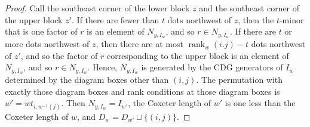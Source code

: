 \documentclass[ALCO,Unicode,published]{cedram}
\DeclareMathOperator{\rank}{rank}
\begin{document}
\begin{proof}
Call the southeast corner of the lower block $z$ and the southeast corner of the upper block $z'$.  If there are fewer than $t$ dots northwest of $z$, then the $t$-minor that is one factor of $r$ is an element of $N_{y,I_w}$, and so $r \in  N_{y,I_w}$.  If there are $t$ or more dots northwest of $z$, then there are at most $\rank_w(i.j)-t$ dots northwest of $z'$, and so the factor of $r$ corresponding to the upper block is an element of $N_{y,I_w}$, and so $r \in N_{y,I_w}$.  Hence, $N_{y,I_w}$ is generated by the CDG generators of $I_w$ determined by the diagram boxes other than $(i,j)$.  The permutation with exactly those diagram boxes and rank conditions at those diagram boxes is $w' = wt_{i,w^{-1}(j)}$.  Then $N_{y,I_w} = I_{w'}$, the Coxeter length of $w'$ is one less than the Coxeter length of $w$, and $D_w = D_{w'} \sqcup \{(i,j)\}$.  
\end{proof}
\end{document}
